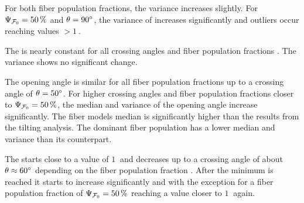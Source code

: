 For both fiber population fractions, the variance increases slightly.
For $\textnormal{$\Psi_{\textnormal{$\mathcal{F}_0$}}$} = \SI{50}{\percent}$ and $\textnormal{$\theta$} = \SI{90}{\degree}$, the variance of \trel{} increases significantly and outliers occur reaching \trel{} values $>\SI{1}{}$.
\par
The \rvalue{} is nearly constant for all crossing angles \modelOmega{} and fiber population fractions \modelPsi{}. The variance shows no significant change.
\par
The opening angle \openingAngle{} is similar for all fiber population fractions up to a crossing angle of $\textnormal{$\theta$}=\SI{50}{\degree}$.
For higher crossing angles and fiber population fractions closer to $\textnormal{$\Psi_{\textnormal{$\mathcal{F}_0$}}$} = \SI{50}{\percent}$, the median and variance of the opening angle increase significantly.
The fiber models median \openingAngle{} is significantly higher than the results from the tilting analysis.
The dominant fiber population has a lower median and \bvariance{} variance than its counterpart.
\par
The \accvalue{} starts close to a value of $\SI{1}{}$ and decreases up to a crossing angle of about $\textnormal{$\theta$} \approx \SI{60}{\degree}$ depending on the fiber population fraction \modelPsi{}.
After the minimum is reached it starts to increase significantly and with the exception for a fiber population fraction of $\textnormal{$\Psi_{\textnormal{$\mathcal{F}_0$}}$}=\SI{50}{\percent}$ reaching a value closer to $\SI{1}{}$ again.
%
%
%
